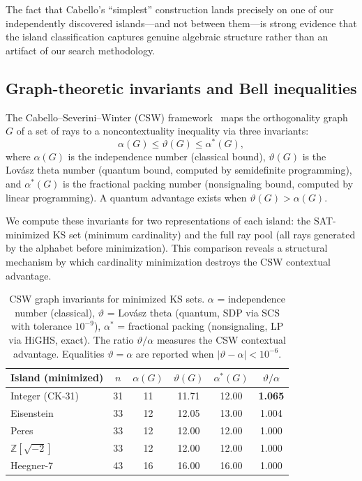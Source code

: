 \documentclass[12pt,a4paper]{article}
\newcommand{\Z}{\mathbb{Z}}
\begin{document}
The fact that Cabello's ``simplest'' construction lands precisely on one of our independently discovered islands---and not between them---is strong evidence that the island classification captures genuine algebraic structure rather than an artifact of our search methodology.

\subsection{Graph-theoretic invariants and Bell inequalities}\label{sec:csw}

The Cabello--Severini--Winter (CSW) framework~\cite{CabelloSeveriniWinter2014} maps the orthogonality graph $G$ of a set of rays to a noncontextuality inequality via three invariants:
\[
\alpha(G) \leq \vartheta(G) \leq \alpha^*(G),
\]
where $\alpha(G)$ is the independence number (classical bound), $\vartheta(G)$ is the Lov\'asz theta number (quantum bound, computed by semidefinite programming), and $\alpha^*(G)$ is the fractional packing number (nonsignaling bound, computed by linear programming). A quantum advantage exists when $\vartheta(G) > \alpha(G)$.

We compute these invariants for two representations of each island: the SAT-minimized KS set (minimum cardinality) and the full ray pool (all rays generated by the alphabet before minimization). This comparison reveals a structural mechanism by which cardinality minimization destroys the CSW contextual advantage.

\begin{table}[ht]
\centering
\caption{CSW graph invariants for minimized KS sets. $\alpha$ = independence number (classical), $\vartheta$ = Lov\'asz theta (quantum, SDP via SCS with tolerance $10^{-9}$), $\alpha^*$ = fractional packing (nonsignaling, LP via HiGHS, exact). The ratio $\vartheta/\alpha$ measures the CSW contextual advantage. Equalities $\vartheta = \alpha$ are reported when $|\vartheta - \alpha| < 10^{-6}$.}
\label{tab:csw-min}
\begin{tabular}{lccccc}
\toprule
Island (minimized) & $n$ & $\alpha(G)$ & $\vartheta(G)$ & $\alpha^*(G)$ & $\vartheta/\alpha$ \\
\midrule
Integer (CK-31) & 31 & 11 & 11.71 & 12.00 & \textbf{1.065} \\
Eisenstein & 33 & 12 & 12.05 & 13.00 & 1.004 \\
Peres & 33 & 12 & 12.00 & 12.00 & 1.000 \\
$\Z[\sqrt{-2}]$ & 33 & 12 & 12.00 & 12.00 & 1.000 \\
Heegner-7 & 43 & 16 & 16.00 & 16.00 & 1.000 \\
\bottomrule
\end{tabular}
\end{table}
\end{document}
